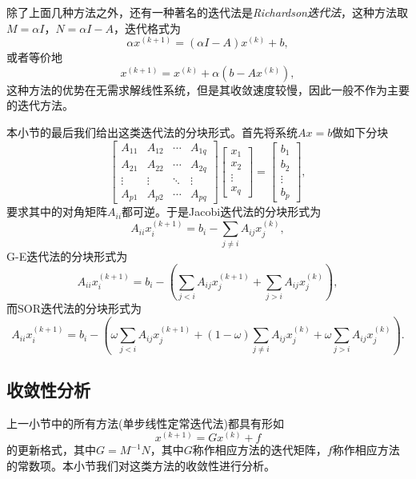 \documentclass[a4paper,10pt]{ctexart}
\begin{document}
除了上面几种方法之外，还有一种著名的迭代法是\emph{Richardson迭代法}，这种方法取$ M=\alpha I $，$ N=\alpha I - A $，迭代格式为
\[
    \alpha x^{(k+1)} = (\alpha I - A)x^{(k)} + b,
\]
或者等价地
\[
    x^{(k+1)} = x^{(k)} + \alpha (b - Ax^{(k)}),
\]
这种方法的优势在无需求解线性系统，但是其收敛速度较慢，因此一般不作为主要的迭代方法。

本小节的最后我们给出这类迭代法的分块形式。首先将系统$ Ax=b $做如下分块
\[
    \begin{bmatrix} 
        A_{11} & A_{12} & \cdots & A_{1q} \\
        A_{21} & A_{22} & \cdots & A_{2q} \\
        \vdots & \vdots & \ddots & \vdots \\
        A_{p1} & A_{p2} & \cdots & A_{pq}
    \end{bmatrix} 
    \begin{bmatrix} 
        x_1 \\ x_2 \\ \vdots \\ x_q
    \end{bmatrix}
    = \begin{bmatrix} 
        b_1 \\ b_2 \\ \vdots \\ b_p
    \end{bmatrix},
\]
要求其中的对角矩阵$ A_{ii} $都可逆。于是Jacobi迭代法的分块形式为
\[
    A_{ii} x^{(k+1)}_i = b_i - \sum_{j\neq i} A_{ij}x^{(k)}_j,
\]
G-E迭代法的分块形式为
\[
    A_{ii} x^{(k+1)}_i = b_i - \left( \sum_{j<i} A_{ij}x^{(k+1)}_j + \sum_{j>i} A_{ij}x^{(k)}_j \right) ,
\]
而SOR迭代法的分块形式为
\[
    A_{ii} x^{(k+1)}_i = b_i - \left( \omega \sum_{j<i} A_{ij}x^{(k+1)}_j + (1-\omega) \sum_{j\neq i} A_{ij}x^{(k)}_j + \omega \sum_{j>i} A_{ij}x^{(k)}_j \right) .
\]

\subsection{收敛性分析}
上一小节中的所有方法(单步线性定常迭代法)都具有形如
\begin{equation}\label{eq:iter}
    x^{(k+1)} = Gx^{(k)} + f
\end{equation}
的更新格式，其中$ G = M^{-1}N $，其中$ G $称作相应方法的迭代矩阵，$ f $称作相应方法的常数项。本小节我们对这类方法的收敛性进行分析。
\end{document}
